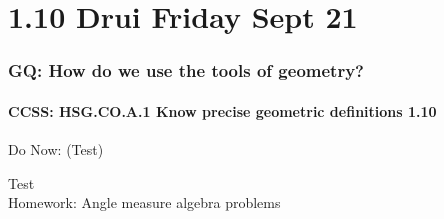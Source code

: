 \documentclass{beamer}
\begin{document}
  \section{1.10 Drui Friday Sept 21}
    \frame
    {
      \frametitle{GQ: How do we use the tools of geometry?}
      \framesubtitle{CCSS: HSG.CO.A.1 Know precise geometric definitions  \alert{1.10}}

      \begin{block}{Do Now: (Test)}
      \end{block}
      Test\\
      \vspace{1cm}
      Homework: Angle measure algebra problems
    }
\end{document}
